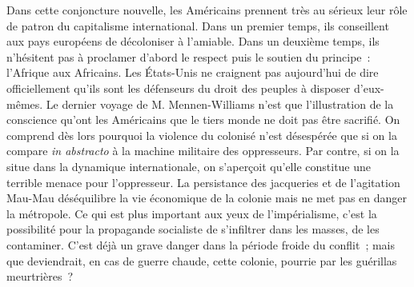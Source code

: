 \documentclass[french,twoside]{book} %
\begin{document}
Dans cette conjoncture nouvelle, les Américains prennent très au sérieux leur rôle de patron du capitalisme international. Dans un premier temps, ils conseillent aux pays européens de décoloniser à l’amiable. Dans un deuxième temps, ils n’hésitent pas à proclamer d’abord le respect puis le soutien du principe : l’Afrique aux Africains. Les États-Unis ne craignent pas aujourd’hui de dire officiellement qu’ils sont les défenseurs du droit des peuples à disposer d’eux-mêmes. Le dernier voyage de M. Mennen-Williams n’est que l’illustration de la conscience qu’ont les Américains que le tiers monde ne doit pas être sacrifié. On comprend dès lors pourquoi la violence du colonisé n’est désespérée que si on la compare \emph{in abstracto} à la machine militaire des oppresseurs. Par contre, si on la situe dans la dynamique internationale, on s’aperçoit qu’elle constitue une terrible menace pour l’oppresseur. La persistance des jacqueries et de l’agitation Mau-Mau déséquilibre la vie économique de la colonie mais ne met pas en danger la métropole. Ce qui est plus important aux yeux de l’impérialisme, c’est la possibilité pour la propagande socialiste de s’infiltrer dans les masses, de les contaminer. C’est déjà un grave danger dans la période froide du conflit ; mais que deviendrait, en cas de guerre chaude, cette colonie, pourrie par les guérillas meurtrières ?\par
\bigbreak
\end{document}
